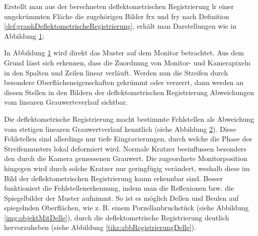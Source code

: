 \p
Erstellt man aus der berechneten deflektometrischen Registrierung \acrshort{lr} einer ungekrümmten Fläche die zugehörigen Bilder \acrshort{frx} und \acrshort{fry} nach Definition \ref{def:graphDeflektometrischeRegistrierung}, erhält man Darstellungen wie in Abbildung \ref{tikz:abbOptimaleSpaltenZeilenReg}:

{
	\begin{figure}[H]
		\centering
		
		\label{tikz:abbOptimaleSpaltenZeilenReg}
	\end{figure}
}

\noindent
In Abbildung \ref{tikz:abbOptimaleSpaltenZeilenReg} wird direkt das Muster auf dem Monitor betrachtet.
Aus dem Grund lässt sich erkennen, dass die Zuordnung von Monitor- und Kamerapixeln in den Spalten und Zeilen linear verläuft.
Werden nun die Streifen durch besondere Oberflächeneigenschaften gekrümmt oder verzerrt, dann werden an diesen Stellen in den Bildern der deflektometrischen Registrierung Abweichungen vom linearen Grauwerteverlauf sichtbar.

{
	\begin{figure}[H]
		\centering
		
		\label{tikz:abbBrillenglasRegistrierung}
	\end{figure}
}

\noindent
Die deflektometrische Registrierung macht bestimmte Fehlstellen als Abweichung vom stetigen linearen Grauwertverlauf kenntlich (siehe Abbildung \ref{tikz:abbBrillenglasRegistrierung}).
Diese Fehlstellen sind allerdings nur tiefe Eingravierungen, durch welche die Phase des Streifenmusters lokal deformiert wird.
Normale Kratzer beeinflussen besonders den durch die Kamera gemessenen Grauwert.
Die zugeordnete Monitorposition hingegen wird durch solche Kratzer nur geringfügig verändert, weshalb diese im Bild der deflektometrischen Registrierung kaum erkennbar sind.
Besser funktioniert die Fehlstellenerkennung, indem man die Reflexionen bzw. die Spiegelbilder der Muster aufnimmt.
So ist es möglich Dellen und Beulen auf spiegelnden Oberflächen, wie z. B. einem Porzellanbruchstück (siehe Abbildung \ref{img:objektMitDelle}), durch die deflektometrische Registrierung deutlich hervorzuheben (siehe Abbildung \ref{tikz:abbRegistrierungDelle}).

